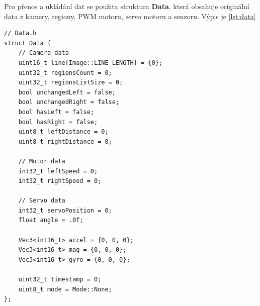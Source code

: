 Pro přenos a ukládání dat se použita struktura \textbf{Data}, která obsahuje originální data z kamery, regiony, PWM motoru, servo motoru a senzoru. Výpis je \ref{lst:data}
\begin{lstlisting}[caption=structura Data, label=lst:data]
// Data.h
struct Data {
    // Camera data
    uint16_t line[Image::LINE_LENGTH] = {0};
    uint32_t regionsCount = 0;
    uint32_t regionsListSize = 0;
    bool unchangedLeft = false;
    bool unchangedRight = false;
    bool hasLeft = false;
    bool hasRight = false;
    uint8_t leftDistance = 0;
    uint8_t rightDistance = 0;

    // Motor data
    int32_t leftSpeed = 0;
    int32_t rightSpeed = 0;

    // Servo data
    int32_t servoPosition = 0;
    float angle = .0f;

    Vec3<int16_t> accel = {0, 0, 0};
    Vec3<int16_t> mag = {0, 0, 0};
    Vec3<int16_t> gyro = {0, 0, 0};

    uint32_t timestamp = 0;
    uint8_t mode = Mode::None;
};
\end{lstlisting}

\endinput

